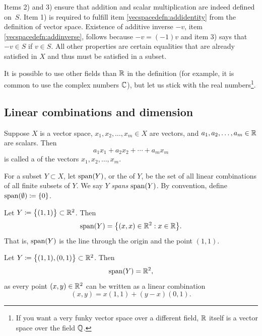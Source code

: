 Items 2) and 3)
ensure that addition and scalar multiplication are indeed defined on~$S$.
Item 1) is required
to fulfill item \ref{vecspacedefn:addidentity} from the definition of vector
space.  Existence
of additive inverse $-v$, item \ref{vecspacedefn:addinverse},
follows because $-v = (-1)v$ and item 3) says that
$-v \in S$ if $v \in S$.  All other properties are certain equalities
that are already satisfied in $X$ and thus must be satisfied in a subset.

\medskip

It is possible to use other fields than ${\mathbb{R}}$ in the definition
(for example, it is common to use the complex numbers ${\mathbb{C}}$),
but let us stick with
the real numbers\footnote{If you want a very funky vector space over a different field,
${\mathbb{R}}$ itself is a vector space over the field ${\mathbb{Q}}$.}.

\subsection{Linear combinations and dimension}

\begin{defn}
Suppose $X$ is a vector space,
$x_1, x_2, \ldots, x_m \in X$ are vectors, and
$a_1, a_2, \ldots, a_m \in {\mathbb{R}}$ are scalars.  Then
\begin{equation*}
a_1 x_1 + 
a_2 x_2 +  \cdots
+ a_m x_m
\end{equation*}
is called a \emph{} of the vectors $x_1, x_2,
\ldots, x_m$.

For a subset $Y \subset X$, let $\operatorname{span}(Y)$,
or the \emph{} of $Y$,
be the set of all linear combinations of all finite subsets of $Y$.
We say $Y$ \emph{spans} $\operatorname{span}(Y)$.
By convention, define $\operatorname{span}(\emptyset) \coloneqq \{ 0 \}$.
\end{defn}

\begin{example}
Let $Y \coloneqq \bigl\{ (1,1) \bigr\} \subset {\mathbb{R}}^2$.  Then
\begin{equation*}
\operatorname{span}(Y)
=
\bigl\{ (x,x) \in {\mathbb{R}}^2 : x \in {\mathbb{R}} \bigr\} .
\end{equation*}
That is, $\operatorname{span}(Y)$ is the line through the origin and the point $(1,1)$.
\end{example}

\begin{example} \label{example:vecspr2span}
Let $Y \coloneqq \bigl\{ (1,1), (0,1) \bigr\} \subset {\mathbb{R}}^2$.  Then
\begin{equation*}
\operatorname{span}(Y)
=
{\mathbb{R}}^2 ,
\end{equation*}
as every point $(x,y) \in {\mathbb{R}}^2$ can be written as
a linear combination
\begin{equation*}
(x,y) = x (1,1) + (y-x) (0,1) .
\end{equation*}
\end{example}

